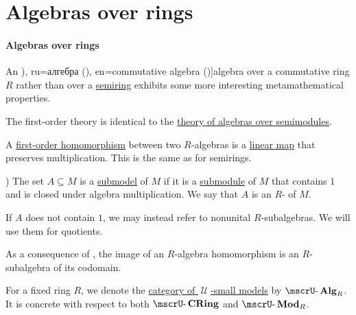 \section{Algebras over rings}\label{sec:algebras_over_rings}

\paragraph{Algebras over rings}

\begin{definition}\label{def:algebra_over_ring}
  An \term[bg=алгебра (\cite[4]{КоцевСидеров2016КомАлгебра}), ru=алгебра (\cite[def. 1.7.1]{Винберг2014Алгебра}), en=commutative algebra (\cite[28]{Eisenbud1995CommAlgebra})]{algebra} over a commutative ring \( R \) rather than over a \hyperref[def:algebra_over_semiring]{semiring} exhibits some more interesting metamathematical properties.

  \begin{thmenum}
    \mimprovised The first-order theory is identical to the \hyperref[def:algebra_over_semiring/theory]{theory of algebras over semimodules}.

     A \hyperref[def:first_order_homomorphism]{first-order homomorphism} between two \( R \)-algebras is a \hyperref[def:linear_function]{linear map} that preserves multiplication. This is the same as for semirings.

    ) The set \( A \subseteq M \) is a \hyperref[def:first_order_submodel]{submodel} of \( M \) if it is a \hyperref[def:monoid/submodel]{submodule} of \( M \) that contains \( 1 \) and is closed under algebra multiplication. We say that \( A \) is an \( R \)- of \( M \).

    If \( A \) does not contain \( 1 \), we may instead refer to nonunital \( R \)-subalgebras. We will use them for quotients.

    As a consequence of , the image of an \( R \)-algebra homomorphism is an \( R \)-subalgebra of its codomain.

    \mimprovised For a fixed ring \( R \), we denote the \hyperref[def:category_of_small_first_order_models]{category of \( \mscrU \)-small models} by \( \ucat{Alg}_R \). It is concrete with respect to both \( \ucat{CRing} \) and \( \ucat{Mod}_R \).


\end{thmenum}
\end{definition}
